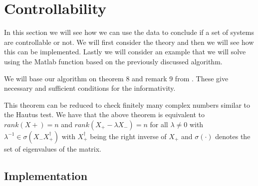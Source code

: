 \section{Controllability}
In this section we will see how we can use the data to conclude if a set of systems are controllable or not. We will first consider the theory and then we will see how this can be implemented. Lastly we will consider an example that we will solve using the Matlab function based on the previously discussed algorithm.


We will base our algorithm on theorem 8 and remark 9 from \cite{waarde2019data}. These give necessary and sufficient conditions for the informativity.


This theorem can be reduced to check finitely many complex numbers similar to the Hautus test. We have that the above theorem is equivalent to $rank(X+) = n$ and $rank(X_+ - \lambda X_-) = n$ for all $\lambda \neq 0$ with $\lambda^{-1} \in \sigma(X_- X_+^\dagger)$ with $X_+^\dagger$ being the right inverse of $X_+$ and $\sigma(\cdot)$ denotes the set of eigenvalues of the matrix.



\subsection{Implementation}

